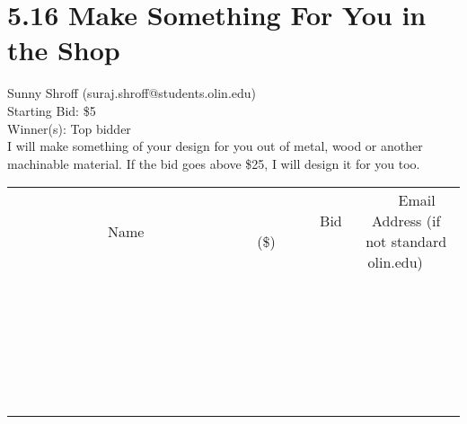 \documentclass[11pt]{article}
\begin{document}
\section*{5.16 Make Something For You in the Shop}
Sunny Shroff (suraj.shroff@students.olin.edu) \\
Starting Bid: \$5 \\
Winner(s): 
Top bidder \\
I will make something of your design for you out of metal, wood or another machinable material. If the bid goes above \$25, I will design it for you too. \\[6ex]
\begin{tabular}{c c c}
~~~~~~~~~~~~~Name~~~~~~~~~~~~~ & ~~~~~~~~~Bid (\$)~~~~~~~~~ & ~~~Email Address (if not standard olin.edu)~~~ \\
 & & \\
\hline
 & & \\
\hline
 & & \\
\hline
 & & \\
\hline
 & & \\
\hline
 & & \\
\hline
 & & \\
\hline
 & & \\
\hline
 & & \\
\hline
 & & \\
\hline
 & & \\
\hline
 & & \\
\hline
 & & \\
\hline
 & & \\
\hline
 & & \\
\hline
 & & \\
\hline
 & & \\
\hline
 & & \\
\hline
 & & \\
\hline
 & & \\
\hline
 & & \\
\hline
 & & \\
\hline
 & & \\
\hline
 & & \\
\hline
 & & \\
\hline
 & & \\
\hline
\end{tabular}
\clearpage
\end{document}
